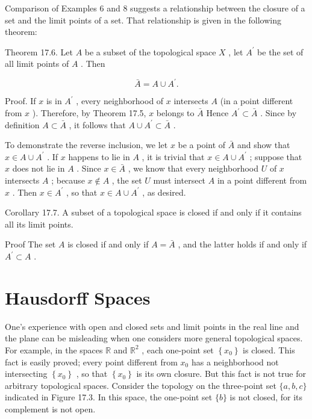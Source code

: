 Comparison of Examples 6 and 8 suggests a relationship between the closure of a set and the limit points of a set. That relationship is given in the following theorem:

Theorem 17.6. Let \(A\) be a subset of the topological space \(X\) , let \({A}^{\prime }\) be the set of all limit points of \(A\) . Then

\[
\bar{A} = A \cup  {A}^{\prime }.
\]

Proof. If \(x\) is in \({A}^{\prime }\) , every neighborhood of \(x\) intersects \(A\) (in a point different from \(x\) ). Therefore, by Theorem 17.5, \(x\) belongs to \(\bar{A}\) Hence \({A}^{\prime } \subset  \bar{A}\) . Since by definition \(A \subset  \bar{A}\) , it follows that \(A \cup  {A}^{\prime } \subset  \bar{A}\) .

To demonstrate the reverse inclusion, we let \(x\) be a point of \(\bar{A}\) and show that \(x \in  A \cup  {A}^{\prime }\) . If \(x\) happens to lie in \(A\) , it is trivial that \(x \in  A \cup  {A}^{\prime }\) ; suppose that \(x\) does not lie in \(A\) . Since \(x \in  \bar{A}\) , we know that every neighborhood \(U\) of \(x\) intersects \(A\) ; because \(x \notin  A\) , the set \(U\) must intersect \(A\) in a point different from \(x\) . Then \(x \in  {A}^{\prime }\) , so that \(x \in  A \cup  {A}^{\prime }\) , as desired.

Corollary 17.7. A subset of a topological space is closed if and only if it contains all its limit points.

Proof The set \(A\) is closed if and only if \(A = \bar{A}\) , and the latter holds if and only if \({A}^{\prime } \subset  A\) .

\section*{Hausdorff Spaces}

One's experience with open and closed sets and limit points in the real line and the plane can be misleading when one considers more general topological spaces. For example, in the spaces \(\mathbb{R}\) and \({\mathbb{R}}^{2}\) , each one-point set \(\left\{  {x}_{0}\right\}\) is closed. This fact is easily proved; every point different from \({x}_{0}\) has a neighborhood not intersecting \(\left\{  {x}_{0}\right\}\) , so that \(\left\{  {x}_{0}\right\}\) is its own closure. But this fact is not true for arbitrary topological spaces. Consider the topology on the three-point set \(\{ a,b,c\}\) indicated in Figure 17.3. In this space, the one-point set \(\{ b\}\) is not closed, for its complement is not open.


